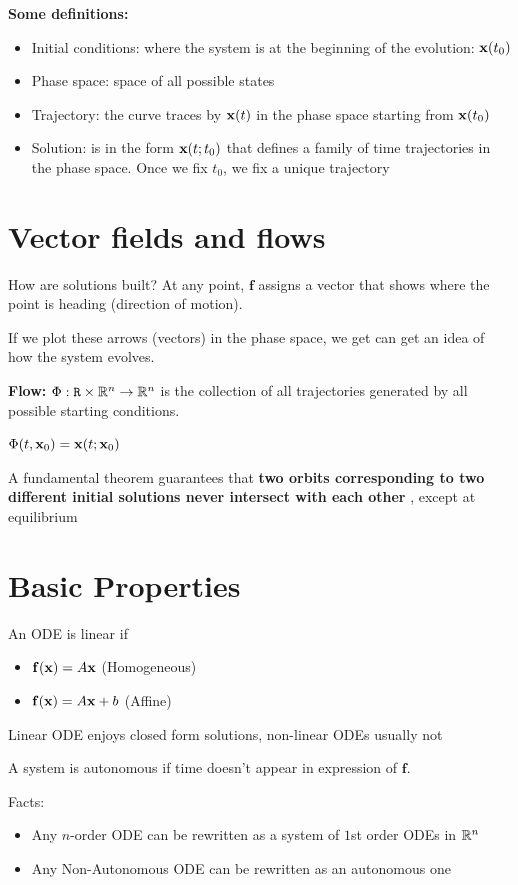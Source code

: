 \textbf{Some definitions:}

\begin{itemize}
    \item Initial conditions: where the system is at the beginning of the evolution:
    $\mathbf{x}(t_0)$
    \item Phase space: space of all possible states
    \item Trajectory: the curve traces by $\mathbf{x}(t)$ in the phase space starting from $\mathbf{x}(t_0)$
    \item Solution: is in the form $\mathbf{x}(t; t_0)$ that defines a family of time trajectories
    in the phase space. Once we fix $t_0$, we fix a unique trajectory
\end{itemize}

\section*{Vector fields and flows}
How are solutions built? At any point, $\mathbf{f}$ assigns a vector
that shows where the point is heading (direction of motion).

If we plot these arrows (vectors) in the phase space, we get can
get an idea of how the system evolves.

\textbf{Flow: } $\Phi: \mathtt{R} \times \mathbb{R}^n \to \mathbb{R}^n$ is the collection of
all trajectories generated by all possible starting conditions.

$\Phi(t, \mathbf{x}_0) = \mathbf{x}(t; \mathbf{x}_0)$


A fundamental theorem guarantees
that \textbf{two orbits corresponding to two different initial solutions never intersect with
each other }, except at equilibrium

\section*{Basic Properties}

An ODE is linear if
\begin{itemize}
    \item $\mathbf{f}(\mathbf{x}) = A\mathbf{x}$ (Homogeneous)
    \item $\mathbf{f}(\mathbf{x}) = A\mathbf{x} + b$ (Affine)
\end{itemize}

Linear ODE enjoys closed form solutions, non-linear ODEs usually not


A system is autonomous if time doesn't appear in expression of $\mathbf{f}$.

Facts:
\begin{itemize}
    \item Any $n$-order ODE can be rewritten as a system of $1$st order ODEs in $\mathbb{R}^n$
    \item Any Non-Autonomous ODE can be rewritten as an autonomous one
\end{itemize}

